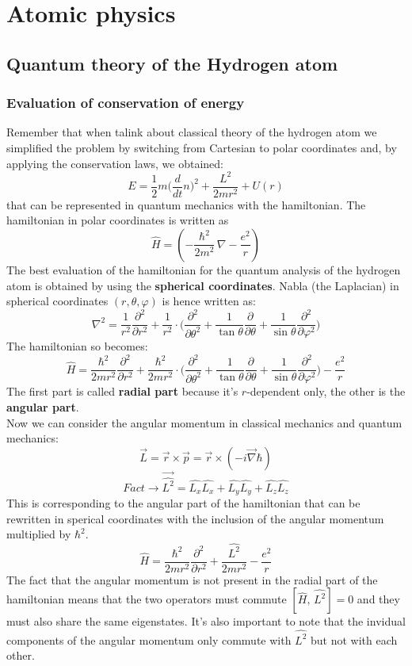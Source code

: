 \graphicspath{{chapters/06/}}
\chapter{Atomic physics}
\section{Quantum theory of the Hydrogen atom}
\subsection{Evaluation of conservation of energy}
Remember that when talink about classical theory of the hydrogen atom we simplified the problem by switching from Cartesian to polar coordinates and, by applying the conservation laws, we obtained:
\[
E=\frac{1}{2}m\bigg(\frac{d}{dt}n\bigg)^2+\frac{L^2}{2mr^2}+U(r)
\]
that can be represented in quantum mechanics with the hamiltonian. The hamiltonian in polar coordinates is written as
\[
\hat{H}=(-\frac{\hbar^2}{2m^2}\, \nabla - \frac{e^2}{r})
\]
The best evaluation of the hamiltonian for the quantum analysis of the hydrogen atom is obtained by using the \textbf{spherical coordinates}. Nabla (the Laplacian) in spherical coordinates $(r,\theta,\varphi)$ is hence written as:
\[
\nabla^2=\frac{1}{r^2}\frac{\partial^2}{\partial r^2}+\frac{1}{r^2}\cdot\bigg(\frac{\partial^2}{\partial \theta^2}+\frac{1}{\tan\theta}\frac{\partial}{\partial\theta}+\frac{1}{\sin\theta}\frac{\partial^2}{\partial\varphi^2}\bigg)
\]
The hamiltonian so becomes:
\[
\hat{H}=\frac{\hbar^2}{2mr^2}\frac{\partial^2}{\partial r^2}+\frac{\hbar^2}{2mr^2}\cdot\bigg(\frac{\partial^2}{\partial \theta^2}+\frac{1}{\tan\theta}\frac{\partial}{\partial\theta}+\frac{1}{\sin\theta}\frac{\partial^2}{\partial\varphi^2}\bigg)-\frac{e^2}{r}
\]
The first part is called \textbf{radial part} because it's $r$-dependent only, the other is the \textbf{angular part}.\\
Now we can consider the angular momentum in classical mechanics and quantum mechanics:
\[
\vec{L}=\vec{r}\times\vec{p}=\vec{r}\times(-i\vec{\nabla}\hbar)
\]
\[
\textit{Fact} \rightarrow \vec{\hat{L^2}}=\hat{L_x}\hat{L_x}+\hat{L_y}\hat{L_y}+\hat{L_z}\hat{L_z}
\]
This is corresponding to the angular part of the hamiltonian that can be rewritten in sperical coordinates with the inclusion of the angular momentum multiplied by $\hbar^2$.
\[
\hat{H}=\frac{\hbar^2}{2mr^2}\frac{\partial^2}{\partial r^2}+\frac{\hat{L^2}}{2mr^2}-\frac{e^2}{r}
\]
The fact that the angular momentum is not present in the radial part of the hamiltonian means that the two operators must commute $[\hat{H},\,\hat{L^2}]=0$ and they must also share the same eigenstates. It's also important to note that the invidual components of the angular momentum only commute with $\hat{L^2}$ but not with each other.\\
